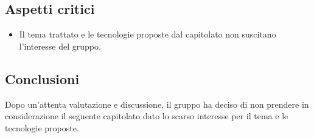 \subsection{Aspetti critici}
\begin{itemize}
	\item Il tema trattato e le tecnologie proposte dal capitolato non suscitano l'interesse del gruppo.
\end{itemize}

\subsection{Conclusioni}
Dopo un'attenta valutazione e discussione, il gruppo ha deciso di non prendere in considerazione il seguente capitolato dato lo scarso interesse per il tema e le tecnologie proposte.